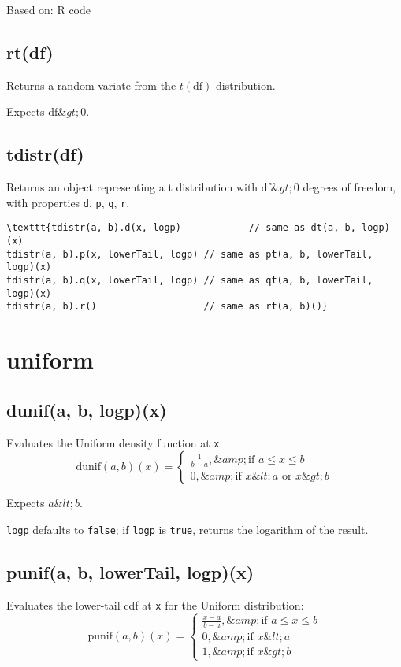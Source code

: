 \documentclass{article}
\begin{document}
Based on: R code


    \subsection*{rt(df)}
    Returns a random variate from the $t(\textrm{df})$ distribution.


Expects $\textrm{df} \&gt; 0$.


    \subsection*{tdistr(df)}
    Returns an object representing a t distribution with $\textrm{df} \&gt; 0$
degrees of freedom, with properties \texttt{d}, \texttt{p}, \texttt{q}, \texttt{r}.


\begin{lstlisting}
\texttt{tdistr(a, b).d(x, logp)            // same as dt(a, b, logp)(x)
tdistr(a, b).p(x, lowerTail, logp) // same as pt(a, b, lowerTail, logp)(x)
tdistr(a, b).q(x, lowerTail, logp) // same as qt(a, b, lowerTail, logp)(x)
tdistr(a, b).r()                   // same as rt(a, b)()}\end{lstlisting}

  \section{uniform}
    \subsection*{dunif(a, b, logp)(x)}
    Evaluates the Uniform density function at \texttt{x}:
$$\textrm{dunif}(a, b)(x) = \begin{cases}
  \frac{1}{b-a},  \&amp; \text{if $a \leq x \leq b$} \\
  0, \&amp; \text{if $x \&lt; a$ or $x \&gt; b$} \end{cases} $$


Expects $a \&lt; b$.


\texttt{logp} defaults to \texttt{false}; if \texttt{logp} is \texttt{true}, returns the
logarithm of the result.


    \subsection*{punif(a, b, lowerTail, logp)(x)}
    Evaluates the lower-tail cdf at \texttt{x} for the Uniform distribution:
$$\textrm{punif}(a, b)(x) = \begin{cases}
  \frac{x-a}{b-a},  \&amp; \text{if $a \leq x \leq b$} \\
  0,                \&amp; \text{if $x \&lt; a$} \\
  1,                \&amp; \text{if $x \&gt; b$} \end{cases} $$
\end{document}
